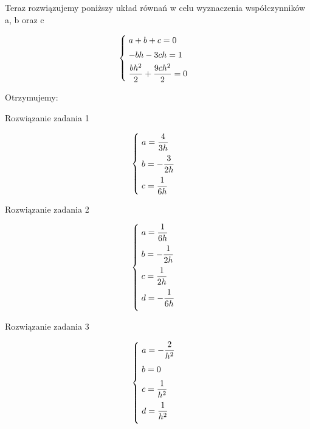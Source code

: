 Teraz rozwiązujemy poniższy układ równań w celu wyznaczenia współczynników a, b oraz c

\[
\begin{cases}
\vspace{0.1cm} 
\hspace{0,1cm}a+b+c=0 \\
\vspace{0.1cm}
\hspace{0,1cm}-bh-3ch=1 \\
\hspace{0,1cm}\dfrac{bh^2}{2} + \dfrac{9ch^2}{2}=0
\end{cases}
\]

Otrzymujemy:

Rozwiązanie zadania 1

\[
\begin{cases}
\vspace{0.2cm} 
\hspace{0,1cm}a=\dfrac{4}{3h} \\
\vspace{0.2cm}
\hspace{0,1cm}b=-\dfrac{3}{2h} \\
\hspace{0,1cm}c=\dfrac{1}{6h}
\end{cases}
\]

Rozwiązanie zadania 2

\[
\begin{cases}
\vspace{0.2cm} 
\hspace{0,1cm}a=\dfrac{1}{6h} \\
\vspace{0.2cm}
\hspace{0,1cm}b=-\dfrac{1}{2h} \\
\vspace{0.2cm}
\hspace{0,1cm}c=\dfrac{1}{2h} \\
\vspace{0.2cm}
\hspace{0,1cm}d=-\dfrac{1}{6h}
\end{cases}
\]

Rozwiązanie zadania 3

\[
\begin{cases}
\vspace{0.2cm} 
\hspace{0,1cm}a=-\dfrac{2}{h^2} \\
\vspace{0.2cm}
\hspace{0,1cm}b=0 \\
\vspace{0.2cm}
\hspace{0,1cm}c=\dfrac{1}{h^2} \\
\vspace{0.2cm}
\hspace{0,1cm}d=\dfrac{1}{h^2}
\end{cases}
\]

